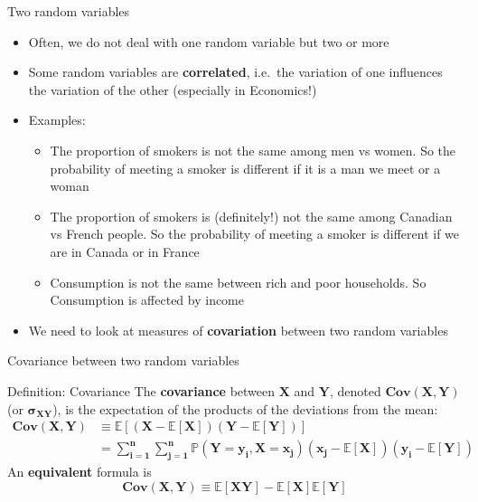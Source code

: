 \documentclass[
  ignorenonframetext,
  aspectratio=169]{beamer}
\providecommand{\tightlist}{%
  \setlength{\itemsep}{0pt}\setlength{\parskip}{0pt}}
\begin{document}
\begin{frame}{Two random variables}
\protect\hypertarget{two-random-variables}{}
\begin{itemize}
\tightlist
\item
  Often, we do not deal with one random variable but two or more
\item
  Some random variables are \textbf{correlated}, i.e.~the variation of
  one influences the variation of the other (especially in Economics!)
\item
  Examples:

  \begin{itemize}
  \tightlist
  \item
    The proportion of smokers is not the same among men vs women. So the
    probability of meeting a smoker is different if it is a man we meet
    or a woman
  \item
    The proportion of smokers is (definitely!) not the same among
    Canadian vs French people. So the probability of meeting a smoker is
    different if we are in Canada or in France
  \item
    Consumption is not the same between rich and poor households. So
    Consumption is affected by income
  \end{itemize}
\item
  We need to look at measures of \textbf{covariation} between two random
  variables
\end{itemize}
\end{frame}

\begin{frame}{Covariance between two random variables}
\protect\hypertarget{covariance-between-two-random-variables}{}
\label{cov}

\begin{block}{Definition: Covariance}
The \textbf{covariance} between $\bm{X}$ and $\bm{Y}$, denoted $\bm{Cov(X,Y)}$ (or $\bm{\sigma_{XY}}$), is the expectation of the products of the deviations from the mean: 
\begin{align*}
\bm{Cov(X,Y)} &\bm{\equiv \mathbb{E}[(X - \mathbb{E}[X])(Y - \mathbb{E}[Y])]} \\
              &\bm{= \sum_{i = 1}^{n}\sum_{j = 1}^{n}\mathbb{P}(Y = y_i,X=x_j)(x_j - \mathbb{E}[X])(y_i - \mathbb{E}[Y])}
\end{align*}
An \textbf{equivalent} formula is $$\bm{Cov(X,Y) \equiv \mathbb{E}[XY] - \mathbb{E}[X]\mathbb{E}[Y]}$$
\end{block}
\end{frame}
\end{document}
